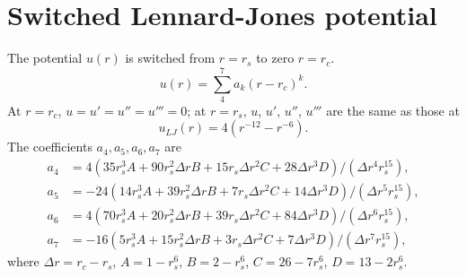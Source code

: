 \documentclass{article}
\begin{document}
\section{Switched Lennard-Jones potential}

The potential $u(r)$ is switched from $r = r_s$ to zero $r = r_c$.
\[
  u(r) = \sum_4^7 a_k (r - r_c)^k.
\]
At $r = r_c$, $u = u' = u'' = u''' = 0$;
at $r = r_s$, $u$, $u'$, $u''$, $u'''$ are the same as those at
\[
  u_{LJ}(r) = 4 (r^{-12} - r^{-6}).
\]
The coefficients $a_4, a_5, a_6, a_7$ are
\begin{align}
  a_4 &= 4 (35 r_s^3 A + 90 r_s^2 \Delta r B + 15 r_s \Delta r^2 C + 28 \Delta r^3 D)/(\Delta r^4 r_s^15), \\
  a_5 &= -24 (14 r_s^3 A + 39 r_s^2 \Delta r B + 7 r_s \Delta r^2 C + 14 \Delta r^3 D)/(\Delta r^5 r_s^15), \\
  a_6 &= 4 (70 r_s^3 A + 20 r_s^2 \Delta r B + 39 r_s \Delta r^2 C + 84 \Delta r^3 D)/(\Delta r^6 r_s^15), \\
  a_7 & = -16 (5 r_s^3 A + 15 r_s^2 \Delta r B + 3 r_s \Delta r^2 C + 7 \Delta r^3 D)/(\Delta r^7 r_s^15),
\end{align}
where $\Delta r = r_c - r_s$,
$A = 1 - r_s^6$,
$B = 2 - r_s^6$,
$C = 26 - 7 r_s^6$,
$D = 13 - 2 r_s^6$.
\end{document}
